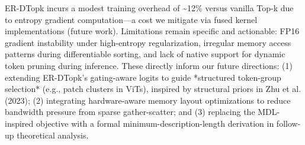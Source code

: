 \documentclass{article}
\begin{document}
ER-DTopk incurs a modest training overhead of \~{}12\% versus vanilla Top-k due to entropy gradient computation---a cost we mitigate via fused kernel implementations (future work). Limitations remain specific and actionable: FP16 gradient instability under high-entropy regularization, irregular memory access patterns during differentiable sorting, and lack of native support for dynamic token pruning during inference. These directly inform our future directions: (1) extending ER-DTopk's gating-aware logits to guide *structured token-group selection* (e.g., patch clusters in ViTs), inspired by structural priors in Zhu et al. (2023); (2) integrating hardware-aware memory layout optimizations to reduce bandwidth pressure from sparse gather-scatter; and (3) replacing the MDL-inspired objective with a formal minimum-description-length derivation in follow-up theoretical analysis.



\end{document}
